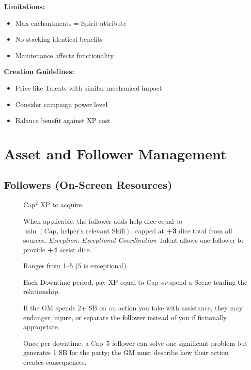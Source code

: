 \textbf{Limitations:}
\begin{itemize}
\item Max enchantments = Spirit attribute
\item No stacking identical benefits
\item Maintenance affects functionality
\end{itemize}

\textbf{Creation Guidelines:}
\begin{itemize}
\item Price like Talents with similar mechanical impact
\item Consider campaign power level
\item Balance benefit against XP cost
\end{itemize}

\section{Asset and Follower Management}
\label{sec:asset-management}

\subsection{Followers (On-Screen Resources)}
\label{subsec:followers}

\begin{description}
\item[] Cap$^{2}$ XP to acquire. 
\item[] When applicable, the follower adds help dice equal to $\min(\text{Cap},\ \text{helper's relevant Skill})$, capped at \textbf{+3} dice total from all sources. \emph{Exception:} \textit{Exceptional Coordination} Talent allows one follower to provide \textbf{+4} assist dice. 
\item[] Ranges from 1--5 (5 is exceptional). 
\item[] Each Downtime period, pay XP equal to Cap \emph{or} spend a Scene tending the relationship. 
\item[] If the GM spends 2+ SB on an action you take with assistance, they may endanger, injure, or separate the follower instead of you if fictionally appropriate. 
\item[] Once per downtime, a Cap~5 follower can solve one significant problem but generates 1 SB for the party; the GM must describe how their action creates consequences. 
\end{description}

